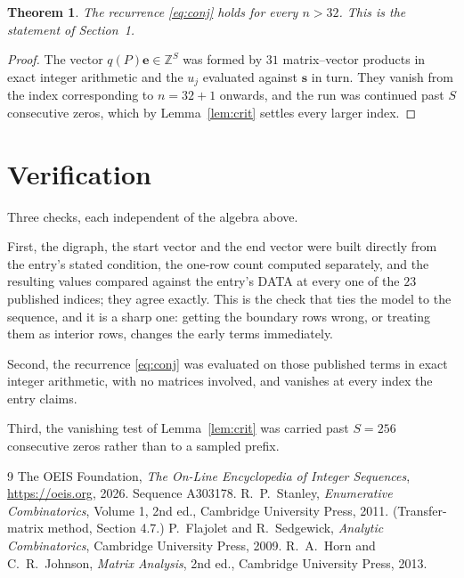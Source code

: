 \documentclass[11pt,a4paper]{article}
\theoremstyle{plain}
\newtheorem{theorem}{Theorem}
\theoremstyle{definition}
\begin{document}
\begin{theorem}
The recurrence \eqref{eq:conj} holds for every $n>32$. This is the statement of
Section~1.
\end{theorem}

\begin{proof}
The vector $q(P)\mathbf{e}\in\mathbb{Z}^{S}$ was formed by $31$ matrix--vector
products in exact integer arithmetic and the $u_j$ evaluated against $\mathbf{s}$ in turn.
They vanish from the index corresponding to $n=32+1$ onwards, and the run was continued
past $S$ consecutive zeros, which by Lemma~\ref{lem:crit} settles every larger index.
\end{proof}

\section{Verification}

Three checks, each independent of the algebra above.

First, the digraph, the start vector and the end vector were built directly from the
entry's stated condition, the one-row count computed separately, and the resulting values
compared against the entry's DATA at every one of the $23$ published indices; they
agree exactly. This is the check that ties the model to the sequence, and it is a sharp one:
getting the boundary rows wrong, or treating them as interior rows, changes the early terms
immediately.

Second, the recurrence \eqref{eq:conj} was evaluated on those published terms in exact
integer arithmetic, with no matrices involved, and vanishes at every index the entry claims.

Third, the vanishing test of Lemma~\ref{lem:crit} was carried past $S=256$ consecutive
zeros rather than to a sampled prefix.

\begin{thebibliography}{9}
 The OEIS Foundation, \emph{The On-Line Encyclopedia of Integer
Sequences}, \url{https://oeis.org}, 2026. Sequence A303178.
 R.~P.~Stanley, \emph{Enumerative Combinatorics}, Volume 1, 2nd ed.,
Cambridge University Press, 2011. (Transfer-matrix method, Section 4.7.)
 P.~Flajolet and R.~Sedgewick, \emph{Analytic Combinatorics}, Cambridge
University Press, 2009.
 R.~A.~Horn and C.~R.~Johnson, \emph{Matrix Analysis}, 2nd ed., Cambridge
University Press, 2013.
\end{thebibliography}
\end{document}
